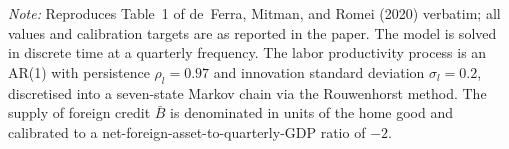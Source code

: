 \documentclass[\latexroot/\projectname]{subfiles}
\begin{document}
\begin{table}[htb]
  \begin{flushleft}
    \footnotesize\noindent\textit{Note:} Reproduces Table~1 of de~Ferra, Mitman, and Romei (2020) verbatim;
    all values and calibration targets are as reported in the paper.
    The model is solved in discrete time at a quarterly frequency. The labor productivity
    process is an AR(1) with persistence $\rho_{l} = 0.97$ and innovation standard deviation
    $\sigma_{l} = 0.2$, discretised into a seven-state Markov chain via the Rouwenhorst method.
    The supply of foreign credit $\bar{B}$ is denominated in units of the home good and
    calibrated to a net-foreign-asset-to-quarterly-GDP ratio of $-2$.
  \end{flushleft}
\end{table}

\smartbib
\end{document}
